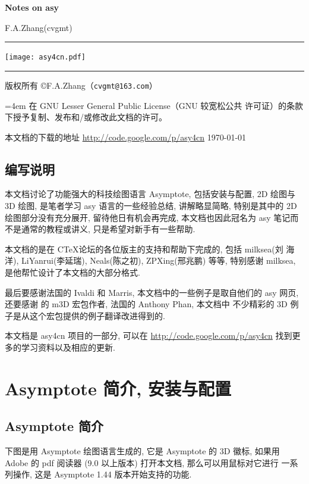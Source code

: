 \documentclass{ctexbook}
\newcommand*\prgname[1]{\textsf{#1}}
\begin{document}
\frontmatter

\begin{titlepage}
  \setlength{\parindent}{0pt}

  \centerline{\Huge\bfseries\prgname{Notes on asy}}
  \hfill F.A.Zhang(cvgmt)
  \rule[0pt]{\textwidth}{4pt}

\centerline{\texttt{[image: asy4cn.pdf]}}

  \rule[0pt]{\textwidth}{2pt}

  版权所有 \copyright{}F.A.Zhang（\nolinkurl{cvgmt@163.com}）

  {\leftskip=4em 在 GNU Lesser General Public License（GNU 较宽松公共
    许可证）的条款下授予复制、发布和/或修改此文档的许可。\par}
  本文档的下载的地址 \url{http://code.google.com/p/asy4cn}
  \qquad\today
\end{titlepage}

\section*{编写说明}
本文档讨论了功能强大的科技绘图语言 Asymptote, 包括安装与配置, 2D 绘图与
3D 绘图, 是笔者学习 asy 语言的一些经验总结, 讲解略显简略, 特别是其中的
2D 绘图部分没有充分展开, 留待他日有机会再完成, 本文档也因此冠名为 asy
笔记而不是通常的教程或讲义, 只是希望对新手有一些帮助.

本文档的是在 C\TeX 论坛的各位版主的支持和帮助下完成的, 包括 milksea(刘
海洋), LiYanrui(李延瑞), Neals(陈之初), ZPXing(邢兆鹏) 等等, 特别感谢
milksea, 是他帮忙设计了本文档的大部分格式.

最后要感谢法国的 Ivaldi 和 Marris, 本文档中的一些例子是取自他们的 asy
网页, 还要感谢 \MP{} 的 m3D 宏包作者, 法国的 Anthony Phan, 本文档中
不少精彩的 3D 例子是从这个宏包提供的例子翻译改进得到的.

本文档是 asy4cn 项目的一部分, 可以在
\url{http://code.google.com/p/asy4cn} 找到更多的学习资料以及相应的更新.

\tableofcontents

\mainmatter

\chapter{Asymptote 简介, 安装与配置}
\section{Asymptote 简介}
下图是用 Asymptote 绘图语言生成的, 它是 Asymptote 的 3D 徽标, 如果用
Adobe 的 pdf 阅读器 (9.0 以上版本) 打开本文档, 那么可以用鼠标对它进行
一系列操作, 这是 Asymptote 1.44 版本开始支持的功能.
\end{document}
